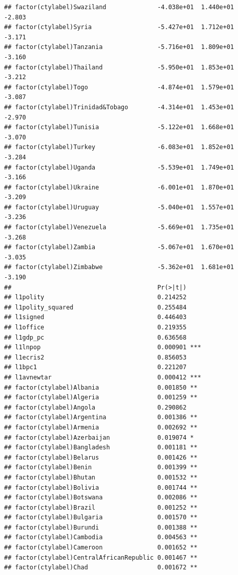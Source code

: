 \documentclass[12pt]{article}\usepackage[]{graphicx}\usepackage[]{color}
\makeatletter
\newenvironment{kframe}{%
 \def\at@end@of@kframe{}%
 \ifinner\ifhmode%
  \def\at@end@of@kframe{\end{minipage}}%
  \begin{minipage}{\columnwidth}%
 \fi\fi%
 \def\FrameCommand##1{\hskip\@totalleftmargin \hskip-\fboxsep
 \colorbox{shadecolor}{##1}\hskip-\fboxsep
     \hskip-\linewidth \hskip-\@totalleftmargin \hskip\columnwidth}%
 \MakeFramed {\advance\hsize-\width
   \@totalleftmargin\z@ \linewidth\hsize
   \@setminipage}}%
 {\par\unskip\endMakeFramed%
 \at@end@of@kframe}
\newenvironment{knitrout}{}{} %
\makeatother
\begin{document}
\begin{knitrout}
\begin{kframe}
\begin{verbatim}
## factor(ctylabel)Swaziland              -4.038e+01  1.440e+01  -2.803
## factor(ctylabel)Syria                  -5.427e+01  1.712e+01  -3.171
## factor(ctylabel)Tanzania               -5.716e+01  1.809e+01  -3.160
## factor(ctylabel)Thailand               -5.950e+01  1.853e+01  -3.212
## factor(ctylabel)Togo                   -4.874e+01  1.579e+01  -3.087
## factor(ctylabel)Trinidad&Tobago        -4.314e+01  1.453e+01  -2.970
## factor(ctylabel)Tunisia                -5.122e+01  1.668e+01  -3.070
## factor(ctylabel)Turkey                 -6.083e+01  1.852e+01  -3.284
## factor(ctylabel)Uganda                 -5.539e+01  1.749e+01  -3.166
## factor(ctylabel)Ukraine                -6.001e+01  1.870e+01  -3.209
## factor(ctylabel)Uruguay                -5.040e+01  1.557e+01  -3.236
## factor(ctylabel)Venezuela              -5.669e+01  1.735e+01  -3.268
## factor(ctylabel)Zambia                 -5.067e+01  1.670e+01  -3.035
## factor(ctylabel)Zimbabwe               -5.362e+01  1.681e+01  -3.190
##                                        Pr(>|t|)    
## l1polity                               0.214252    
## l1polity_squared                       0.255484    
## l1signed                               0.446403    
## l1office                               0.219355    
## l1gdp_pc                               0.636568    
## l1lnpop                                0.000901 ***
## l1ecris2                               0.856053    
## l1bpc1                                 0.221207    
## l1avnewtar                             0.000412 ***
## factor(ctylabel)Albania                0.001850 ** 
## factor(ctylabel)Algeria                0.001259 ** 
## factor(ctylabel)Angola                 0.290862    
## factor(ctylabel)Argentina              0.001386 ** 
## factor(ctylabel)Armenia                0.002692 ** 
## factor(ctylabel)Azerbaijan             0.019074 *  
## factor(ctylabel)Bangladesh             0.001181 ** 
## factor(ctylabel)Belarus                0.001426 ** 
## factor(ctylabel)Benin                  0.001399 ** 
## factor(ctylabel)Bhutan                 0.001532 ** 
## factor(ctylabel)Bolivia                0.001744 ** 
## factor(ctylabel)Botswana               0.002086 ** 
## factor(ctylabel)Brazil                 0.001252 ** 
## factor(ctylabel)Bulgaria               0.001570 ** 
## factor(ctylabel)Burundi                0.001388 ** 
## factor(ctylabel)Cambodia               0.004563 ** 
## factor(ctylabel)Cameroon               0.001652 ** 
## factor(ctylabel)CentralAfricanRepublic 0.001467 ** 
## factor(ctylabel)Chad                   0.001672 ** 

\end{verbatim}
\end{kframe}
\end{knitrout}
\end{document}
